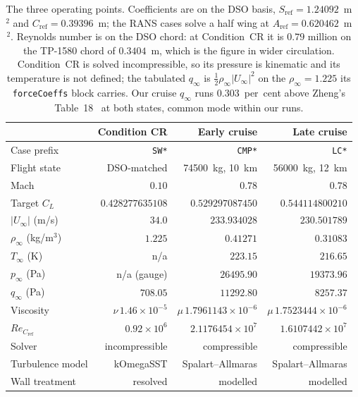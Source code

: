 \begin{table}[htbp]
  \centering
  \footnotesize
  \caption{The three operating points. Coefficients are on the DSO basis,
  $S_\mathrm{ref} = \num{1.24092}$~m$^2$ and $C_\mathrm{ref} = \num{0.39396}$~m; the RANS cases
  solve a half wing at $A_\mathrm{ref} = \num{0.620462}$~m$^2$. Reynolds number is on the DSO
  chord: at Condition~CR it is $0.79$ million on the TP-1580 chord of $\num{0.3404}$~m, which is
  the figure in wider circulation. Condition~CR is solved incompressible, so its pressure is
  kinematic and its temperature is not defined; the tabulated $q_\infty$ is
  $\tfrac{1}{2}\rho_\infty|U_\infty|^2$ on the $\rho_\infty = 1.225$ its \texttt{forceCoeffs}
  block carries. Our cruise $q_\infty$ runs $0.303$~per~cent above Zheng's
  Table~18~\cite{zheng} at both states, common mode within our runs.}
  \label{tab:cond:points}
  \begin{tabular}{lrrr}
    \toprule
                                        & Condition CR      & Early cruise            & Late cruise \\
    \midrule
    Case prefix                         & \texttt{SW*}      & \texttt{CMP*}           & \texttt{LC*} \\
    Flight state                        & DSO-matched       & \num{74500}~kg, 10~km   & \num{56000}~kg, 12~km \\
    Mach                                & $0.10$            & $0.78$                  & $0.78$ \\
    Target $C_L$                        & $0.428277635108$  & $0.529297087450$        & $0.544114800210$ \\
    $|U_\infty|$ (m/s)                  & $34.0$            & $233.934028$            & $230.501789$ \\
    $\rho_\infty$ (kg/m$^3$)            & $1.225$           & $0.41271$               & $0.31083$ \\
    $T_\infty$ (K)                      & n/a               & $223.15$                & $216.65$ \\
    $p_\infty$ (Pa)                     & n/a (gauge)       & $\num{26495.90}$        & $\num{19373.96}$ \\
    $q_\infty$ (Pa)                     & $708.05$          & $\num{11292.80}$        & $\num{8257.37}$ \\
    Viscosity                           & $\nu\,1.46\times10^{-5}$ & $\mu\,1.7961143\times10^{-6}$ & $\mu\,1.7523444\times10^{-6}$ \\
    $Re_{C_\mathrm{ref}}$               & $0.92\times10^{6}$ & $2.1176454\times10^{7}$ & $1.6107442\times10^{7}$ \\
    Solver                              & incompressible    & compressible            & compressible \\
    Turbulence model                    & kOmegaSST         & Spalart--Allmaras       & Spalart--Allmaras \\
    Wall treatment                      & resolved          & modelled                & modelled \\
    \bottomrule
  \end{tabular}
\end{table}
